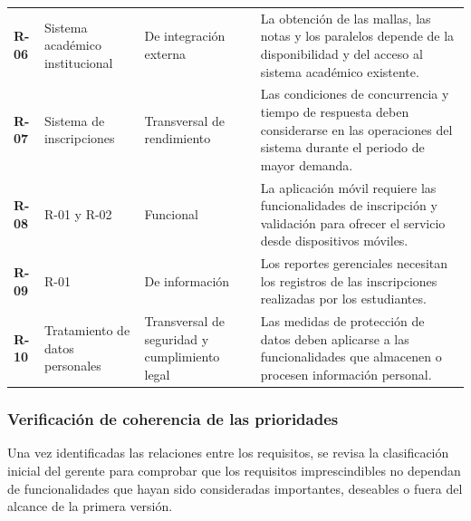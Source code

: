 \documentclass[12pt,a4paper]{article}
\begin{document}
\begin{longtable}{
    C{1.1cm}
    L{3.2cm}
    L{4.0cm}
    L{6.0cm}
}
\textbf{R-06} &
Sistema académico institucional &
De integración externa &
La obtención de las mallas, las notas y los
paralelos depende de la disponibilidad y
del acceso al sistema académico existente. \\

\textbf{R-07} &
Sistema de inscripciones &
Transversal de rendimiento &
Las condiciones de concurrencia y tiempo
de respuesta deben considerarse en las
operaciones del sistema durante el periodo
de mayor demanda. \\

\textbf{R-08} &
R-01 y R-02 &
Funcional &
La aplicación móvil requiere las funcionalidades
de inscripción y validación para ofrecer
el servicio desde dispositivos móviles. \\

\textbf{R-09} &
R-01 &
De información &
Los reportes gerenciales necesitan los registros
de las inscripciones realizadas por los
estudiantes. \\

\textbf{R-10} &
Tratamiento de datos personales &
Transversal de seguridad y cumplimiento legal &
Las medidas de protección de datos deben
aplicarse a las funcionalidades que almacenen
o procesen información personal. \\

\end{longtable}

\endgroup

\subsubsection{Verificación de coherencia de las prioridades}

Una vez identificadas las relaciones entre los requisitos,
se revisa la clasificación inicial del gerente para
comprobar que los requisitos imprescindibles no dependan
de funcionalidades que hayan sido consideradas importantes,
deseables o fuera del alcance de la primera versión.

\begingroup

\small
\singlespacing
\setlength{\tabcolsep}{4pt}
\end{document}

